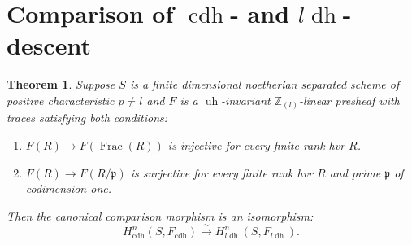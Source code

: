 \documentclass[10pt]{amsart}
\newtheorem{theo}{Theorem}
\theoremstyle{definition}
\newcommand{\p}{\mathfrak{p}}
\newcommand{\zll}{\mathbb{Z}_{(l)}}
\DeclareMathOperator{\Frac}{Frac}
\newcommand{\cdh}{{{\operatorname{cdh}}}}
\newcommand{\ldh}{{l{\operatorname{dh}}}}
\newcommand{\uh}{\operatorname{uh}}
\begin{document}
\section{Comparison of $\cdh$- and $\ldh$-descent} \label{sec:cdhldhComp}

\begin{theo} \label{theo:mainTheorem}
Suppose $S$ is a finite dimensional noetherian separated scheme of positive characteristic $p \neq l$ and $F$ is a $\uh$-invariant $\zll$-linear presheaf with traces satisfying \emph{both} conditions:
\begin{enumerate}
 \item[(G1)] $F(R) \to F(\Frac(R))$ is injective for every finite rank hvr $R$.

 \item[(G2)] $F(R) \to F(R / \p)$ is surjective for every finite rank hvr $R$ and prime $\p$ of codimension one.
\end{enumerate}
Then the canonical comparison morphism is an isomorphism:
\[ H_\cdh^n(S, F_\cdh) \stackrel{\sim}{\to} H_\ldh^n(S, F_\ldh). \]
\end{theo}
\end{document}
